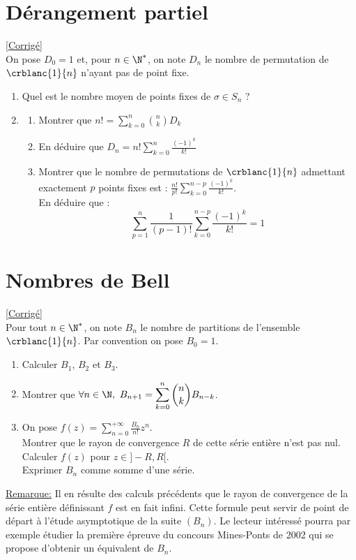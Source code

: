 \documentclass[8pt]{book}
\begin{document}
\section{Dérangement partiel }
\label{Dérangement partiel}
\textcolor{blue}{\hyperref[Dérangement partiel corrigé]{[Corrigé]}}\\
On pose $D_0=1$ et, pour $n\in\N^*$, on note $D_n$ le nombre de permutation de $\crblanc{1}{n}$ n'ayant pas de point fixe.
\begin{enumerate}
	\item Quel est le nombre moyen de points fixes de $\sigma\in S_n$ ?
	\item \begin{enumerate}[label=\alph*.]
		\item Montrer que $n!=\displaystyle\sum\limits_{k=0}^n\binom{n}{k}D_{k}$
		\item En déduire que $D_n=n!\displaystyle\sum\limits_{k=0}^n\frac{(-1)^k}{k!}$
		\item Montrer que le nombre de permutations de $\crblanc{1}{n}$ admettant exactement $p$ points fixes est : $\displaystyle\frac{n!}{p!}\sum_{k=0}^{n-p}\frac{(-1)^k}{k!}$.
		\\ En déduire que : $$\sum_{p=1}^n\frac{1}{(p-1)!}\sum_{k=0}^{n-p}\frac{(-1)^k}{k!}=1$$
	\end{enumerate}
\end{enumerate}

\section{Nombres de Bell }
\label{Nombres de Bell}
\textcolor{blue}{\hyperref[Nombres de Bell corrigé]{[Corrigé]}}\\
Pour tout $n\in\N^*$, on note $B_n$ le nombre de partitions de l'ensemble $\crblanc{1}{n}$. Par convention on pose $B_0=1$.
\begin{enumerate}[leftmargin=*]
	\item Calculer $B_1$, $B_2$ et $B_3$.
	\item Montrer que $\forall n\in \N,\ B_{n+1}=\displaystyle\sum_{k=0}^n\binom{n}{k}B_{n-k}$.
	\item On pose $f(z)=\displaystyle\sum\limits_{n=0}^{+\infty}\frac{B_n}{n!}z^n$.
	\\Montrer que le rayon de convergence $R$ de cette série entière n'est pas nul. Calculer $f(z)$ pour $z\in]-R,R[$.
	\\Exprimer $B_n$ comme somme d'une série.
\end{enumerate}
\underline{Remarque:} Il en résulte des calculs précédents que le rayon de convergence de la série entière définissant $f$ est en fait infini. Cette formule peut servir de point de départ à l'étude asymptotique de la suite $(B_n)$. Le lecteur intéressé pourra par exemple étudier la première épreuve du concours Mines-Ponts de 2002 qui se propose d'obtenir un équivalent de $B_n$.
\end{document}
